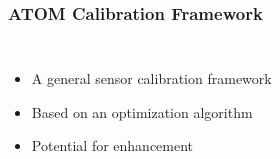 \begin{frame}
\frametitle{ATOM Calibration Framework}
\begin{columns}

\begin{itemize}
    \item A general sensor calibration framework
    \item Based on an optimization algorithm
    \item Potential for enhancement
\end{itemize}

\end{columns}
\end{frame}
